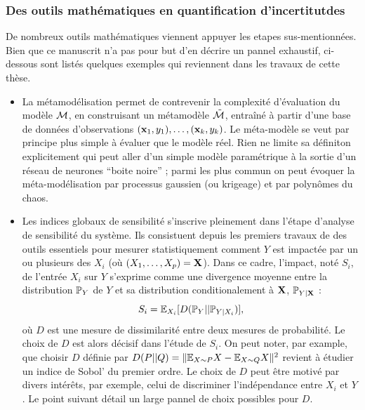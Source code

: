 \subsubsection{Des outils mathématiques en quantification d'incertitutdes}

De nombreux outils mathématiques viennent appuyer les etapes sus-mentionnées. Bien que ce manuscrit n'a pas pour but d'en décrire un pannel exhaustif, ci-dessous sont listés quelques exemples qui reviennent dans les travaux de cette thèse.

\begin{itemize}
    \item La métamodélisation %
    permet de contrevenir la complexité d'évaluation du modèle $\mathcal{M}$, en construisant un métamodèle $\tilde{\mathcal{M}}$, entraîné à partir d'une base de données d'observations $(\mathbf{x}_1, y_1),\dots,(\mathbf{x}_k,y_k)$. Le méta-modèle se veut par principe plus simple à évaluer que le modèle réel. 
    Rien ne limite sa définiton explicitement qui peut aller d'un simple modèle paramétrique à la sortie d'un réseau de neurones ``boite noire'' ; parmi les plus commun on peut évoquer la méta-modélisation par processus gaussien (ou krigeage) et par polynômes du chaos. 
    \item Les indices globaux de sensibilité s'inscrive pleinement dans l'étape d'analyse de sensibilité du système. Ils consistuent depuis les premiers travaux de \citet{sobol_sensitivity_1993} des outils essentiels pour mesurer statistiquement comment $ Y$ est impactée par un ou plusieurs des $X_i$ (où $(X_1,\dots,X_p)=\mathbf{X}$). Dans ce cadre, l'impact, noté $S_i$, de l'entrée $X_i$ sur $ Y$ s'exprime comme une divergence moyenne entre la distribution $\mathbb{P}_{ Y}$ de $ Y$ et sa distribution conditionalement à $\mathbf{X}$, $\mathbb{P}_{Y|\mathbf{X}}$ \citep{da_veiga_global_2015} : 
        \begin{equation}
            S_i = \mathbb{E}_{X_i}[D(\mathbb{P}_{ Y}||\mathbb{P}_{Y|X_i})],
        \end{equation}
    où $D$ est une mesure de dissimilarité entre deux mesures de probabilité.
    Le choix de $D$ est alors décisif dans l'étude de $S_i$. %
    On peut noter, par example, que choisir $D$ définie par $D(P||Q) = \|\mathbb{E}_{X\sim P}X-\mathbb{E}_{X\sim Q}X\|^2$ revient à étudier un indice de Sobol' du premier ordre.
    Le choix de $D$ peut être motivé par divers intérêts, par exemple, celui de discriminer  l'indépendance entre $X_i$ et $ Y$. Le point suivant détail un large pannel de choix possibles pour $D$.


\end{itemize}

